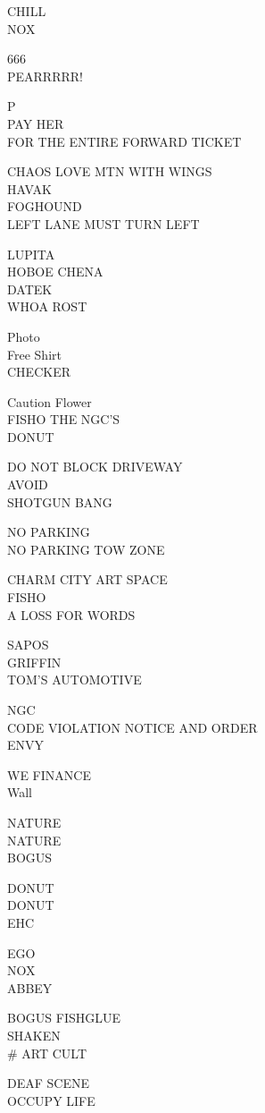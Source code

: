 \documentclass[10pt,letterpaper]{article}
\begin{document}
CHILL\\
NOX

666\\
PEARRRRR!

P\\
PAY HER\\
FOR THE ENTIRE FORWARD TICKET

CHAOS LOVE MTN WITH WINGS\\
HAVAK\\
FOGHOUND\\
LEFT LANE MUST TURN LEFT

LUPITA\\
HOBOE CHENA\\
DATEK\\
WHOA ROST

Photo\\
Free Shirt\\
CHECKER

Caution Flower\\
FISHO THE NGC'S\\
DONUT

DO NOT BLOCK DRIVEWAY\\
AVOID\\
SHOTGUN BANG

NO PARKING\\
NO PARKING TOW ZONE

CHARM CITY ART SPACE\\
FISHO\\
A LOSS FOR WORDS

SAPOS\\
GRIFFIN\\
TOM'S AUTOMOTIVE

NGC\\
CODE VIOLATION NOTICE AND ORDER\\
ENVY

WE FINANCE\\
Wall

NATURE\\
NATURE\\
BOGUS

DONUT\\
DONUT\\
EHC

EGO\\
NOX\\
ABBEY

BOGUS FISHGLUE\\
SHAKEN\\
\# ART CULT

DEAF SCENE\\
OCCUPY LIFE
\end{document}
